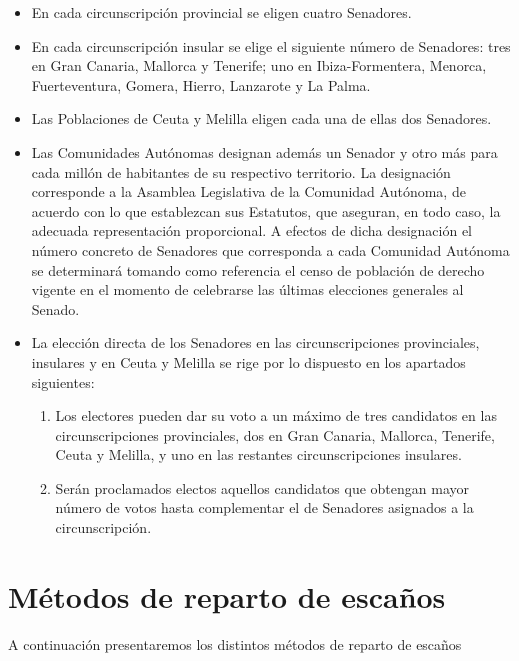 \documentclass[12pt,a4paper,]{book}
\numberwithin{dummy}{section}
\theoremstyle{ocrenumbox}
\theoremstyle{blacknumex}
\theoremstyle{blacknumbox}
\theoremstyle{ocrenum}
\theoremstyle{ocrenum}
\begin{document}
\begin{itemize}
\item
  En cada circunscripción provincial se eligen cuatro Senadores.
\item
  En cada circunscripción insular se elige el siguiente número de
  Senadores: tres en Gran Canaria, Mallorca y Tenerife; uno en
  Ibiza-Formentera, Menorca, Fuerteventura, Gomera, Hierro, Lanzarote y
  La Palma.
\item
  Las Poblaciones de Ceuta y Melilla eligen cada una de ellas dos
  Senadores.
\item
  Las Comunidades Autónomas designan además un Senador y otro más para
  cada millón de habitantes de su respectivo territorio. La designación
  corresponde a la Asamblea Legislativa de la Comunidad Autónoma, de
  acuerdo con lo que establezcan sus Estatutos, que aseguran, en todo
  caso, la adecuada representación proporcional. A efectos de dicha
  designación el número concreto de Senadores que corresponda a cada
  Comunidad Autónoma se determinará tomando como referencia el censo de
  población de derecho vigente en el momento de celebrarse las últimas
  elecciones generales al Senado.
\item
  La elección directa de los Senadores en las circunscripciones
  provinciales, insulares y en Ceuta y Melilla se rige por lo dispuesto
  en los apartados siguientes:

  \begin{enumerate}
  \def\labelenumi{\alph{enumi})}
  \item
    Los electores pueden dar su voto a un máximo de tres candidatos en
    las circunscripciones provinciales, dos en Gran Canaria, Mallorca,
    Tenerife, Ceuta y Melilla, y uno en las restantes circunscripciones
    insulares.
  \item
    Serán proclamados electos aquellos candidatos que obtengan mayor
    número de votos hasta complementar el de Senadores asignados a la
    circunscripción.
  \end{enumerate}
\end{itemize}

\hypertarget{muxe9todos-de-reparto-de-escauxf1os}{%
\chapter{Métodos de reparto de
escaños}\label{muxe9todos-de-reparto-de-escauxf1os}}

A continuación presentaremos los distintos métodos de reparto de escaños
\end{document}
